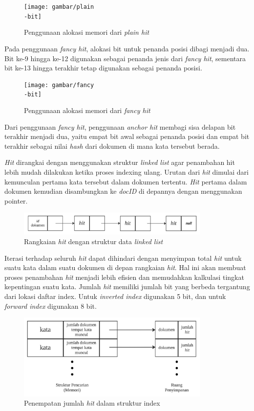 \begin{figure}[H]
  \centering{}
	\texttt{[image: gambar/plain\\-bit]}
  \caption{Penggunaan alokasi memori dari \emph{plain hit}}
\end{figure}

Pada penggunaan \emph{fancy hit}, alokasi bit untuk penanda posisi dibagi
menjadi dua. Bit ke-9 hingga ke-12 digunakan sebagai penanda jenis dari
\emph{fancy hit}, sementara bit ke-13 hingga terakhir tetap digunakan sebagai
penanda posisi.

\begin{figure}[H]
  \centering{}
	\texttt{[image: gambar/fancy\\-bit]}
  \caption{Penggunaan alokasi memori dari \emph{fancy hit}}
\end{figure}

Dari penggunaan \emph{fancy hit}, penggunaan \emph{anchor hit} membagi sisa
delapan bit terakhir menjadi dua, yaitu empat bit awal sebagai penanda posisi
dan empat bit terakhir sebagai nilai \emph{hash} dari dokumen di mana kata
tersebut berada.

\emph{Hit} dirangkai dengan menggunakan struktur \emph{linked list} agar
penambahan hit lebih mudah dilakukan ketika proses indexing ulang. Urutan dari
\emph{hit} dimulai dari kemunculan pertama kata tersebut dalam dokumen tertentu.
\emph{Hit} pertama dalam dokumen kemudian disambungkan ke \textit{docID} di
depannya dengan menggunakan pointer.

\begin{figure}[H]
  \centering{}
	\includegraphics[width=0.85\textwidth]{gambar/linkedListHit}
  \caption{Rangkaian \emph{hit} dengan struktur data \emph{linked list}}
\end{figure}

Iterasi terhadap seluruh \emph{hit} dapat dihindari dengan menyimpan total
\emph{hit} untuk suatu kata dalam suatu dokumen di depan rangkaian \emph{hit}.
Hal ini akan membuat proses penambahan \emph{hit} menjadi lebih efisien dan
memudahkan kalkulasi tingkat kepentingan suatu kata. Jumlah \textit{hit}
memiliki jumlah bit yang berbeda tergantung dari lokasi daftar index. Untuk 
\textit{inverted index} digunakan 5 bit, dan untuk \textit{forward index}
digunakan 8 bit.

\begin{figure}[H]
  \centering{}
	\includegraphics[width=0.85\textwidth]{gambar/hubunganStrukturPencarian}
  \caption{Penempatan jumlah \emph{hit} dalam struktur index}
\end{figure}

